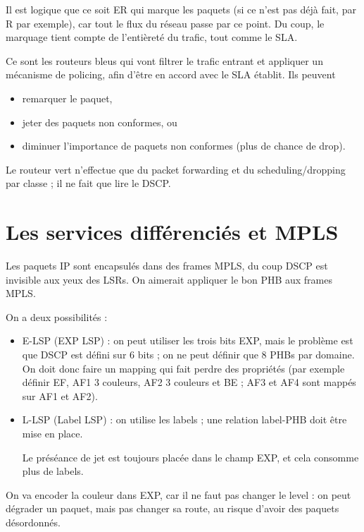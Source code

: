 			Il est logique que ce soit ER qui marque les paquets (si ce n'est pas déjà fait, par R par exemple), car tout le flux du réseau passe par ce point. Du coup, le marquage tient compte de l'entièreté du trafic, tout comme le SLA.
			
			Ce sont les routeurs bleus qui vont filtrer le trafic entrant et appliquer un mécanisme de policing, afin d'être en accord avec le SLA établit. Ils peuvent
			
			\begin{itemize}
				\item remarquer le paquet,
				\item jeter des paquets non conformes, ou
				\item diminuer l'importance de paquets non conformes (plus de chance de drop).
			\end{itemize}
			
			Le routeur vert n'effectue que du packet forwarding et du scheduling/dropping par classe ; il ne fait que lire le DSCP.
			
			\section{Les services différenciés et MPLS}
			
			Les paquets IP sont encapsulés dans des frames MPLS, du coup DSCP est invisible aux yeux des LSRs. On aimerait appliquer le bon PHB aux frames MPLS.
			
			
			On a deux possibilités :
			
			\begin{itemize}
				\item E-LSP (EXP LSP) : on peut utiliser les trois bits EXP, mais le problème est que DSCP est défini sur 6 bits ; on ne peut définir que 8 PHBs par domaine. On doit donc faire un mapping qui fait perdre des propriétés (par exemple définir EF, AF1 3 couleurs, AF2 3 couleurs et BE ; AF3 et AF4 sont mappés sur AF1 et AF2).
				
					\item L-LSP (Label LSP) : on utilise les labels ; une relation label-PHB doit être mise en place.
					
					Le préséance de jet est toujours placée dans le champ EXP, et cela consomme plus de labels.
			\end{itemize}
			
			On va encoder la couleur dans EXP, car il ne faut pas changer le level : on peut dégrader un paquet, mais pas changer sa route, au risque d'avoir des paquets désordonnés.
		
